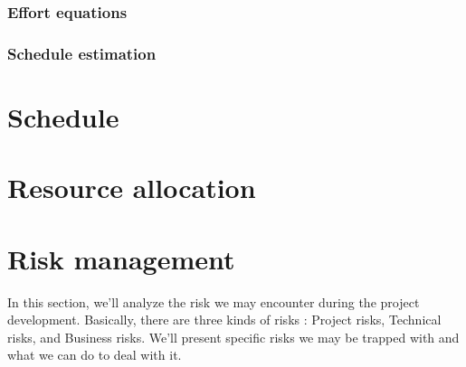 \documentclass{article}
\begin{document}
	\subsubsection{Effort equations}
	\subsubsection{Schedule estimation}
\newpage

\section{Schedule}

\newpage

\section{Resource allocation}

\newpage

\section{Risk management}
In this section, we'll analyze the risk we may encounter during the project development. Basically, there are three kinds of risks : Project risks, Technical risks, and Business risks. We'll present specific risks we may be trapped with and what we can do to deal with it.\\
\end{document}
